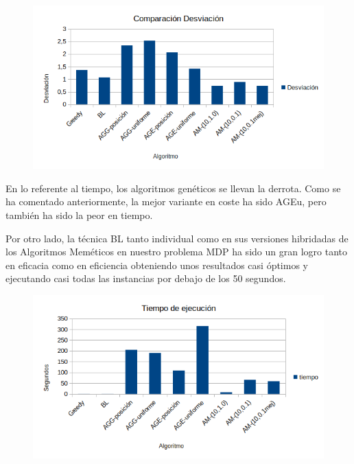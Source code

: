 \begin{figure}[H]
	\centering
	\includegraphics[scale=0.6]{img/res1.png}
	
\end{figure}


En lo referente al tiempo, los algoritmos genéticos se llevan la derrota. Como se ha comentado anteriormente, la mejor variante en coste ha sido AGEu, pero también ha sido la peor en tiempo.

Por otro lado, la técnica BL tanto individual como en sus versiones hibridadas de los Algoritmos Meméticos en nuestro problema MDP ha sido un gran logro tanto en eficacia como en eficiencia obteniendo unos resultados casi óptimos y ejecutando casi todas las instancias por debajo de los 50 segundos.

\begin{figure}[H]
	\centering
	\includegraphics[scale=0.6]{img/time.png}
	
\end{figure}






\newpage

